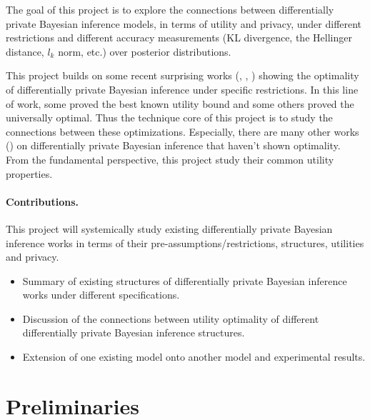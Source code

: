 \documentclass{article}
\begin{document}
The goal of this project is to explore the connections between differentially private Bayesian
inference models, in terms of utility and privacy, under different restrictions and different accuracy measurements (KL divergence, the Hellinger
distance, $l_k$ norm, etc.) over posterior distributions.
%
%

This project builds on some recent surprising works (\cite{ghosh2012universally}, \cite{zhang2016differential}, \cite{bernstein2020noise}) showing the optimality of differentially private Bayesian inference under specific restrictions. 
In this line of work, some proved the best known utility bound and some others proved the universally optimal.
% 
Thus the technique core of this project is to study the connections between these optimizations. 
Especially, there are many other works (\cite{bernstein2019differentially}) on differentially private Bayesian inference that haven't shown optimality.   
From the fundamental perspective, this project study their common utility properties.
%
\paragraph{Contributions.}
This project will systemically study existing differentially private Bayesian inference works in terms of their pre-assumptions/restrictions, structures, utilities and privacy.

\begin{itemize}
	\item Summary of existing structures of differentially private Bayesian inference works under different specifications.
%
	\item Discussion of the connections between utility optimality of different differentially private Bayesian inference structures. 
%	
	\item Extension of one existing model onto another model and experimental results.
%
\end{itemize}

\section{Preliminaries}
\end{document}
